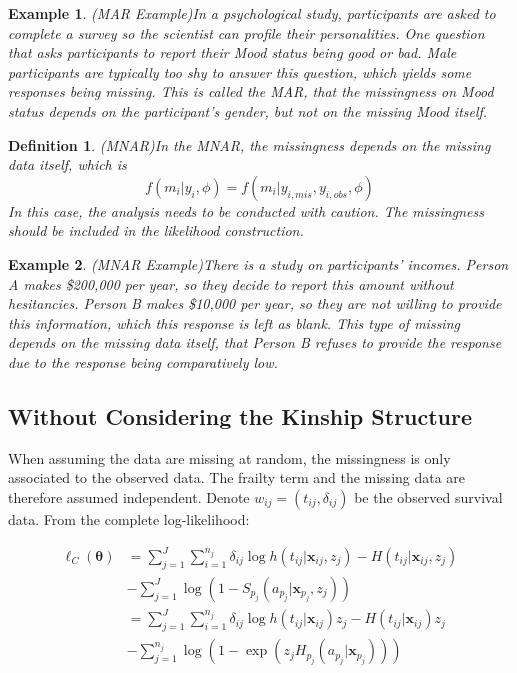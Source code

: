 \documentclass[preprint,12pt]{elsarticle}
\newtheorem{defn}{Definition}
\newtheorem{eg}{Example}
\begin{document}
\begin{eg}(MAR Example)\label{eg:MARExample}
    In a psychological study, participants are asked to complete a survey so the scientist can profile their personalities. 
    One question that asks participants to report their Mood status being good or bad. 
    Male participants are typically too shy to answer this question, which yields some responses being missing. 
    This is called the MAR, that the missingness on Mood status depends on the participant's gender, but not on the missing Mood itself.
\end{eg}
\begin{defn}(MNAR)\label{defn:MNAR}
    In the MNAR, the missingness depends on the missing data itself, which is 
    \begin{equation} 
        f(m_i|y_i,\phi)=f(m_i|y_{i,mis}, y_{i,obs}, \phi)
    \end{equation}
    In this case, the analysis needs to be conducted with caution. 
    The missingness should be included in the likelihood construction.
\end{defn}
\begin{eg}(MNAR Example)\label{eg:MNARExample}
    There is a study on participants' incomes. 
    Person A makes \$200,000 per year, so they decide to report this amount without hesitancies. 
    Person B makes \$10,000 per year, so they are not willing to provide this information, which this response is left as blank. 
    This type of missing depends on the missing data itself, that Person B refuses to provide the response due to the response being comparatively low. 
\end{eg}
\subsection{Without Considering the Kinship Structure}
When assuming the data are missing at random, the missingness is only associated to the observed data. 
The frailty term and the missing data are therefore assumed independent. 
Denote $w_{ij} = (t_{ij}, \delta_{ij})$ be the observed survival data.
From the complete log-likelihood:

\begin{align} 
    \ell_C(\boldsymbol{\theta})&=\sum_{j=1}^J\sum_{i=1}^{n_j}\delta_{ij}\log h(t_{ij}|\mathbf{x}_{ij}, z_j) - H(t_{ij}|\mathbf{x}_{ij}, z_j)\\
    &-\sum_{j=1}^J \log (1-S_{p_j}(a_{p_j}|\mathbf{x}_{p_j}, z_j)) \\
    &= \sum_{j=1}^J\sum_{i=1}^{n_j}\delta_{ij}\log h(t_{ij}|\mathbf{x}_{ij})z_j - H(t_{ij}|\mathbf{x}_{ij})z_j \\
    &- \sum_{j=1}^{n_j} \log(1- \exp(z_j H_{p_j}(a_{p_j}|\mathbf{x}_{p_j})))
\end{align}
\end{document}
